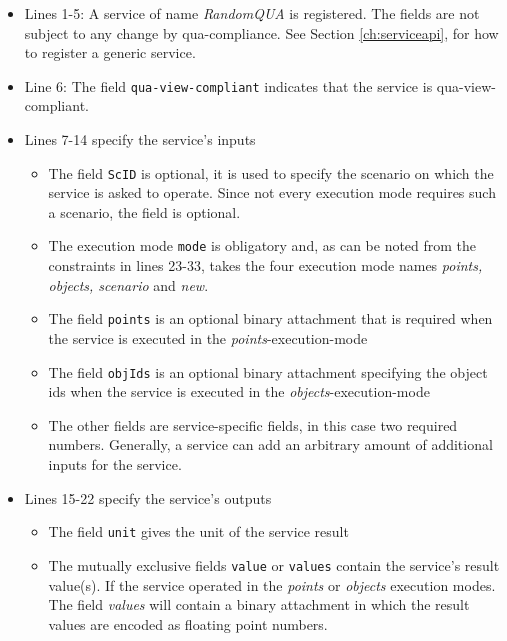 \begin{itemize}
  \item Lines 1-5: A service of name \emph{RandomQUA} is registered. The fields are not subject to any change by qua-compliance. See Section \ref{ch:serviceapi}, for how to register a generic service.
  \item Line 6: The field \texttt{qua-view-compliant} indicates that the service is qua-view-compliant.
  \item Lines 7-14 specify the service's inputs
    \begin{itemize}
      \item The field \texttt{ScID} is optional, it is used to specify the scenario on which the service is asked to operate. Since not every execution mode requires such a scenario, the field is optional.
      \item The execution mode \texttt{mode} is obligatory and, as can be noted from the constraints in lines 23-33, takes the four execution mode names \emph{points, objects, scenario} and \emph{new}.
      \item The field \texttt{points} is an optional binary attachment that is required when the service is executed in the \emph{points}-execution-mode
      \item The field \texttt{objIds} is an optional binary attachment specifying the object ids when the service is executed in the \emph{objects}-execution-mode
      \item The other fields are service-specific fields, in this case two required numbers. Generally, a service can add an arbitrary amount of additional inputs for the service.
    \end{itemize}
  \item Lines 15-22 specify the service's outputs
    \begin{itemize}
      \item The field \texttt{unit} gives the unit of the service result
      \item The mutually exclusive fields \texttt{value} or \texttt{values} contain the service's result value(s).
        If the service operated in the \emph{points} or \emph{objects} execution modes.
        The field \emph{values} will contain a binary attachment in which the result values are encoded as floating point numbers.


\end{itemize}
\end{itemize}
